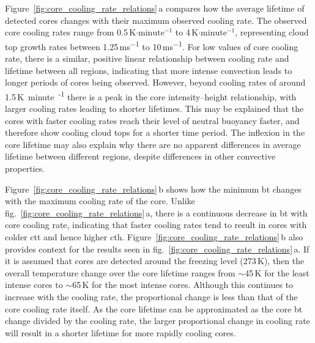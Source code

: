 Figure~\ref{fig:core_cooling_rate_relations}\,a compares how the average lifetime of detected cores changes with their maximum observed cooling rate.
The observed core cooling rates range from 0.5\,K$\mathrm{\cdot minute^{-1}}$ to 4\,K$\mathrm{\cdot minute^{-1}}$, representing cloud top growth rates between 1.25\,\unit{ms^{-1}} to 10\,\unit{ms^{-1}}.
For low values of core cooling rate, there is a similar, positive linear relationship between cooling rate and lifetime between all regions, indicating that more intense convection leads to longer periods of cores being observed.
However, beyond cooling rates of around 1.5\,\unit{K minute\textsuperscript{-1}} there is a peak in the core intensity--height relationship, with larger cooling rates leading to shorter lifetimes.
This may be explained that the cores with faster cooling rates reach their level of neutral buoyancy faster, and therefore show cooling cloud tops for a shorter time period.
The inflexion in the core lifetime may also explain why there are no apparent differences in average lifetime between different regions, despite differences in other convective properties.

Figure~\ref{fig:core_cooling_rate_relations}\,b shows how the minimum \acrshort{bt} changes with the maximum cooling rate of the core.
Unlike fig.~\ref{fig:core_cooling_rate_relations}\,a, there is a continuous decrease in \acrshort{bt} with core cooling rate, indicating that faster cooling rates tend to result in cores with colder \acrshort{ctt} and hence higher \acrshort{cth}.
Figure~\ref{fig:core_cooling_rate_relations}\,b also provides context for the results seen in fig.~\ref{fig:core_cooling_rate_relations}\,a.
If it is assumed that cores are detected around the freezing level (273\,\unit{K}), then the overall temperature change over the core lifetime ranges from $\sim$45\,\unit{K} for the least intense cores to $\sim$65\,\unit{K} for the most intense cores.
Although this continues to increase with the cooling rate, the proportional change is less than that of the core cooling rate itself.
As the core lifetime can be approximated as the core \acrshort{bt} change divided by the cooling rate, the larger proportional change in cooling rate will result in a shorter lifetime for more rapidly cooling cores.

